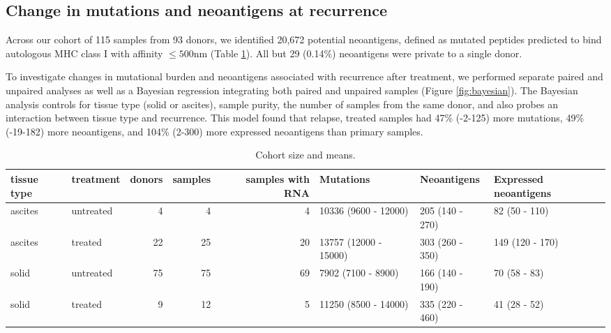 \subsection*{Change in mutations and neoantigens at recurrence}
Across our cohort of 115 samples from 93 donors, we identified 20,672 potential neoantigens, defined as mutated peptides predicted to bind autologous MHC class I with affinity $\leq 500$nm (Table \ref{tab:cohort}). All but 29 (0.14\%) neoantigens were private to a single donor.

To investigate changes in mutational burden and neoantigens associated with recurrence after treatment, we performed separate paired and unpaired analyses as well as a Bayesian regression integrating both paired and unpaired samples (Figure \ref{fig:bayesian}). The Bayesian analysis controls for tissue type (solid or ascites), sample purity, the number of samples from the same donor, and also probes an interaction between tissue type and recurrence. This model found that relapse, treated samples had 47\% (-2-125) more mutations, 49\% (-19-182) more neoantigens, and 104\% (2-300) more expressed neoantigens than primary samples.

\begin{table}
\begin{tabular}{llrrrlll}
\toprule
tissue type &  treatment &  donors &  samples &  samples with RNA &              Mutations &      Neoantigens & Expressed neoantigens \\
\midrule
    ascites &  untreated &       4 &        4 &                 4 &   10336 (9600 - 12000) &  205 (140 - 270) &         82 (50 - 110) \\
    ascites &    treated &      22 &       25 &                20 &  13757 (12000 - 15000) &  303 (260 - 350) &       149 (120 - 170) \\
      solid &  untreated &      75 &       75 &                69 &     7902 (7100 - 8900) &  166 (140 - 190) &          70 (58 - 83) \\
      solid &    treated &       9 &       12 &                 5 &   11250 (8500 - 14000) &  335 (220 - 460) &          41 (28 - 52) \\
\bottomrule
\end{tabular}
\caption{Cohort size and means.}
\label{tab:cohort}
\end{table}


